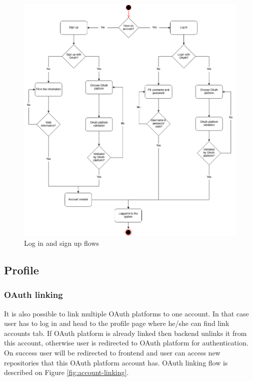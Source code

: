 \begin{figure}[h]
    \includegraphics[width=\textwidth]{figures/login_signup_user_flow}
    \caption{Log in and sign up flows}
    \label{fig:login-signup-diagram}
\end{figure}

\subsection{Profile}\label{subsec:profile}
\subsubsection{OAuth linking}\label{subsubsec:oauth-linking}
It is also possible to link multiple OAuth platforms to one account.
In that case user has to log in and head to the profile page where he/she can find link accounts tab.
If OAuth platform is already linked then backend unlinks it from this account, otherwise user is redirected to OAuth platform for authentication.
On success user will be redirected to frontend and user can access new repositories that this OAuth platform account has.
OAuth linking flow is described on Figure
\ref{fig:account-linking}.

